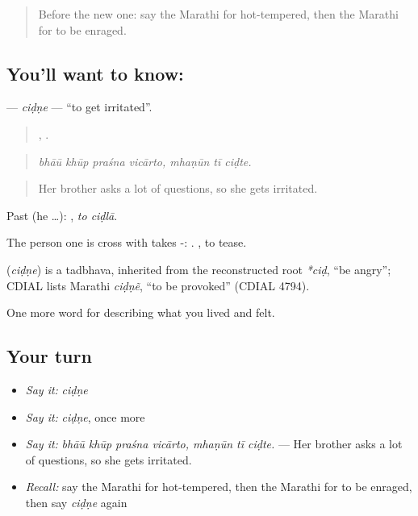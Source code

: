\label{lesson:MR-C453-cidne}



\begin{quote}
Before the new one: say the Marathi for hot-tempered, then the Marathi for to be enraged.
\end{quote}

\subsection*{You'll want to know: }
\textbf{} — \emph{ciḍṇe} — \textquotedblleft{}to get irritated\textquotedblright{}.

\begin{quote}
   ,   .
\end{quote}

\begin{quote}
\emph{bhāū khūp praśna vicārto, mhaṇūn tī ciḍte.}
\end{quote}

\begin{quote}
Her brother asks a lot of questions, so she gets irritated.
\end{quote}

Past (he …):  , \emph{to ciḍlā}.

The person one is cross with takes -:   . , to tease.

\begin{cousinweb}
\textbf{} (\emph{ciḍṇe}) is a tadbhava, inherited from the reconstructed root \emph{*ciḍ}, \textquotedblleft{}be angry\textquotedblright{}; CDIAL lists Marathi \emph{ciḍṇẽ}, \textquotedblleft{}to be provoked\textquotedblright{} (CDIAL 4794).
\end{cousinweb}

\begin{grammarlens}[title={What you've built}]
One more word for describing what you lived and felt.
\end{grammarlens}

\subsection*{Your turn}
\begin{itemize}
\raggedright
  \item \emph{Say it:} \emph{ciḍṇe}
  \item \emph{Say it:} \emph{ciḍṇe}, once more
  \item \emph{Say it:} \emph{bhāū khūp praśna vicārto, mhaṇūn tī ciḍte.} — Her brother asks a lot of questions, so she gets irritated.
  \item \emph{Recall:} say the Marathi for hot-tempered, then the Marathi for to be enraged, then say \emph{ciḍṇe} again
\end{itemize}

